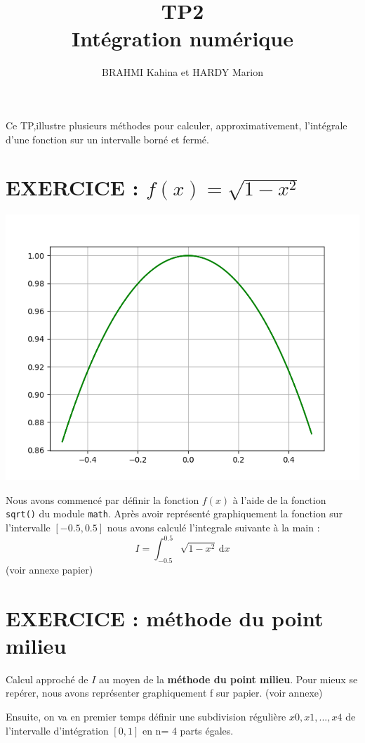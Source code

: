 \documentclass{article}
\title{TP2\\ Intégration numérique}
\author{BRAHMI Kahina et HARDY Marion}
\begin{document}
\maketitle

	Ce TP,illustre plusieurs méthodes pour calculer, approximativement, l'intégrale d'une fonction sur un intervalle borné et fermé.

\section{EXERCICE : $f(x) = \sqrt{1 - x^2}$}

\begin{center}
	\includegraphics[scale=0.5]{Courbef.png}
\end{center}

Nous avons commencé par définir la fonction $f(x)$ à l'aide de la fonction \texttt{sqrt()} du module \texttt{math}. 
Après avoir représenté graphiquement la fonction sur l'intervalle $[-0.5, 0.5]$ nous avons calculé l'integrale suivante à la main : $$I=\int_{-0.5}^{0.5} \sqrt{1-x^2} \, \mathrm{d}x $$ (voir annexe papier)


\section{EXERCICE :  méthode du point milieu}

Calcul approché de $I$ au moyen de la {\bf méthode du point milieu}. Pour mieux se repérer, nous avons représenter graphiquement f sur papier. (voir annexe)

Ensuite, on va en premier temps définir une subdivision régulière $x0,x1,...,x4$ de l'intervalle d'intégration $[0,1]$ en n= 4 parts égales. 
\end{document}
